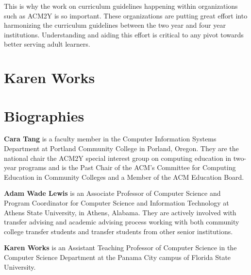 \documentclass{article}
\begin{document}
This is why the work on curriculum guidelines happening
within organizations such as ACM2Y is so
important.  These organizations are putting great effort into
harmonizing the curriculum guidelines between the two year and four year
institutions. Understanding and aiding this effort is critical to any
pivot towards better serving adult learners.

\section{Karen Works}

\section{Biographies}
\textbf{Cara Tang} is a faculty member in the Computer Information
Systems Department at Portland Community College in Porland, Oregon.   They are the
national chair the ACM2Y special interest group on computing education
in two-year programs and is the Past Chair of the ACM's Committee for
Computing Education in Community Colleges and a Member of the ACM
Education Board.

\noindent
\textbf{Adam Wade Lewis} is an Associate Professor of Computer Science
and Program Coordinator for Computer Science and Information Technology
at Athens State University, in Athens, Alabama.  They are actively
involved with transfer advising and academic advising process working
with both community college transfer students and transfer students from
other senior institutions.

\noindent
\textbf{Karen Works} is an Assistant Teaching Professor of Computer
Science in the Computer Science Department at the Panama City campus of
Florida State University.  
\end{document}
